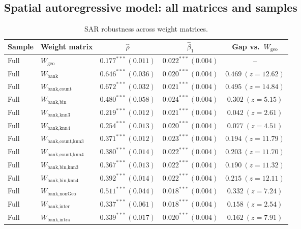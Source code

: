 \clearpage
 
\subsection{Spatial autoregressive model: all matrices and samples}
\begin{table}[htbp]
  \centering
  \caption{SAR robustness across weight matrices.}
  \label{tab:sar-full}
  \footnotesize
  \begin{tabular}{llccc}
    \toprule
    Sample & Weight matrix & $\hat\rho$ & $\hat\beta_1$ & Gap vs.\ $W_{\text{geo}}$ \\
    \midrule
    Full & $W_{\text{geo}}$ & $0.177^{***}\,(0.011)$ & $0.022^{***}\,(0.004)$ & -- \\
    Full & $W_{\text{bank}}$ & $0.646^{***}\,(0.036)$ & $0.020^{***}\,(0.004)$ & $0.469\ (z{=}12.62)$ \\
    Full & $W_{\text{bank,count}}$ & $0.672^{***}\,(0.032)$ & $0.021^{***}\,(0.004)$ & $0.495\ (z{=}14.84)$ \\
    Full & $W_{\text{bank,bin}}$ & $0.480^{***}\,(0.058)$ & $0.024^{***}\,(0.004)$ & $0.302\ (z{=}5.15)$ \\
    Full & $W_{\text{bank,knn3}}$ & $0.219^{***}\,(0.012)$ & $0.021^{***}\,(0.004)$ & $0.042\ (z{=}2.61)$ \\
    Full & $W_{\text{bank,knn4}}$ & $0.254^{***}\,(0.013)$ & $0.020^{***}\,(0.004)$ & $0.077\ (z{=}4.51)$ \\
    Full & $W_{\text{bank,count,knn3}}$ & $0.371^{***}\,(0.012)$ & $0.023^{***}\,(0.004)$ & $0.194\ (z{=}11.79)$ \\
    Full & $W_{\text{bank,count,knn4}}$ & $0.380^{***}\,(0.014)$ & $0.022^{***}\,(0.004)$ & $0.203\ (z{=}11.70)$ \\
    Full & $W_{\text{bank,bin,knn3}}$ & $0.367^{***}\,(0.013)$ & $0.022^{***}\,(0.004)$ & $0.190\ (z{=}11.32)$ \\
    Full & $W_{\text{bank,bin,knn4}}$ & $0.392^{***}\,(0.014)$ & $0.022^{***}\,(0.004)$ & $0.215\ (z{=}12.11)$ \\
    Full & $W_{\text{bank,nonGeo}}$ & $0.511^{***}\,(0.044)$ & $0.018^{***}\,(0.004)$ & $0.332\ (z{=}7.24)$ \\
    Full & $W_{\text{bank,inter}}$ & $0.337^{***}\,(0.061)$ & $0.018^{***}\,(0.004)$ & $0.158\ (z{=}2.54)$ \\
    Full & $W_{\text{bank,intra}}$ & $0.339^{***}\,(0.017)$ & $0.020^{***}\,(0.004)$ & $0.162\ (z{=}7.91)$ \\

\end{tabular}
\end{table}
